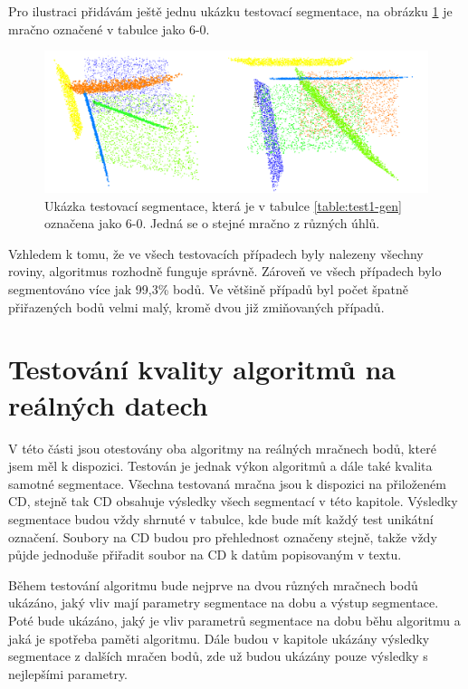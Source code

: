 \documentclass[11pt,twoside,a4paper]{book}
\begin{document}
Pro ilustraci přidávám ještě jednu ukázku testovací segmentace, na obrázku \ref{fig:test-6-0} je mračno označené v tabulce jako 6-0.

\begin{figure}[H]
\begin{center}
\includegraphics[width=\textwidth]{figures/test-6-0}
\caption{Ukázka testovací segmentace, která je v tabulce \ref{table:test1-gen} označena jako 6-0. Jedná se o stejné mračno z různých úhlů.}
\label{fig:test-6-0}
\end{center}
\end{figure}

Vzhledem k tomu, že ve všech testovacích případech byly nalezeny všechny roviny, algoritmus rozhodně funguje správně. Zároveň ve všech případech bylo segmentováno více jak 99,3\% bodů. Ve většině případů byl počet špatně přiřazených bodů velmi malý, kromě dvou již zmiňovaných případů.

\newpage
\section{Testování kvality algoritmů na reálných datech}

V této části jsou otestovány oba algoritmy na reálných mračnech bodů, které jsem měl k dispozici. Testován je jednak výkon algoritmů a dále také kvalita samotné segmentace. Všechna testovaná mračna jsou k dispozici na přiloženém CD, stejně tak CD obsahuje výsledky všech segmentací v této kapitole. Výsledky segmentace budou vždy shrnuté v tabulce, kde bude mít každý test unikátní označení. Soubory na CD budou pro přehlednost označeny stejně, takže vždy půjde jednoduše přiřadit soubor na CD k datům popisovaným v textu.

Během testování algoritmu bude nejprve na dvou různých mračnech bodů ukázáno, jaký vliv mají parametry segmentace na dobu a výstup segmentace. Poté bude ukázáno, jaký je vliv parametrů segmentace na dobu běhu algoritmu a jaká je spotřeba paměti algoritmu. Dále budou v kapitole ukázány výsledky segmentace z dalších mračen bodů, zde už budou ukázány pouze výsledky s nejlepšími parametry.
\end{document}
